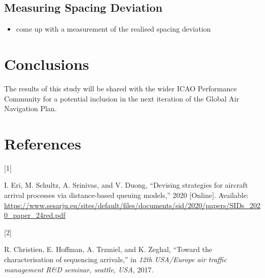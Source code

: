 \documentclass[
  journal,
]{IEEEtran}%
\providecommand{\tightlist}{%
  \setlength{\itemsep}{0pt}\setlength{\parskip}{0pt}}\usepackage{longtable,booktabs,array}
\newlength{\cslhangindent}
\newlength{\csllabelwidth}
\newenvironment{CSLReferences}[2] %
 {\begin{list}{}{%
  \setlength{\itemindent}{0pt}
  \setlength{\leftmargin}{0pt}
  \setlength{\parsep}{0pt}
  \ifodd #1
   \setlength{\leftmargin}{\cslhangindent}
   \setlength{\itemindent}{-1\cslhangindent}
  \fi
  \setlength{\itemsep}{#2\baselineskip}}}
 {\end{list}}
\newcommand{\CSLLeftMargin}[1]{\parbox[t]{\csllabelwidth}{\strut#1\strut}}
\newcommand{\CSLRightInline}[1]{\parbox[t]{\linewidth - \csllabelwidth}{\strut#1\strut}}
\begin{document}
\subsection{Measuring Spacing
Deviation}\label{measuring-spacing-deviation}

\begin{tcolorbox}[enhanced jigsaw, titlerule=0mm, coltitle=black, colback=white, breakable, toprule=.15mm, arc=.35mm, colbacktitle=quarto-callout-note-color!10!white, bottomtitle=1mm, opacitybacktitle=0.6, opacityback=0, leftrule=.75mm, left=2mm, toptitle=1mm, title=\textcolor{quarto-callout-note-color}{\faInfo}\hspace{0.5em}{Note}, colframe=quarto-callout-note-color-frame, rightrule=.15mm, bottomrule=.15mm]

\begin{itemize}
\tightlist
\item
  come up with a measurement of the realised spacing deviation
\end{itemize}

\end{tcolorbox}

\section{Conclusions}\label{conclusions}

The results of this study will be shared with the wider ICAO Performance
Community for a potential inclusion in the next iteration of the Global
Air Navigation Plan.

\section*{References}\label{references}

\label{refs}
\begin{CSLReferences}{0}{0}
\CSLLeftMargin{{[}1{]} }%
\CSLRightInline{I. Eri, M. Schultz, A. Srinivas, and V. Duong,
{``Devising strategies for aircraft arrival processes via distance-based
queuing models,''} 2020 {[}Online{]}. Available:
\url{https://www.sesarju.eu/sites/default/files/documents/sid/2020/papers/SIDs_2020_paper_24red.pdf}}

\CSLLeftMargin{{[}2{]} }%
\CSLRightInline{R. Christien, E. Hoffman, A. Trzmiel, and K. Zeghal,
{``Toward the characterisation of sequencing arrivals,''} in \emph{12th
{USA}/{Europe} air traffic management {R}\&{D} seminar, seattle, {USA}},
2017. }

\end{CSLReferences}
\end{document}
